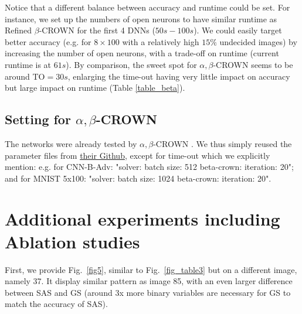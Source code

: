 Notice that a different balance between accuracy and runtime could be set. For instance, we set up the numbers of open neurons to have similar runtime as Refined $\beta$-CROWN for the first 4 DNNs ($50s-100s$). We could easily target better accuracy (e.g. for $8 \times 100$ with a relatively high $15\%$ undecided images) by increasing the number of open neurons, with a trade-off on runtime (current runtime is at $61s$).
By comparison, the sweet spot for $\alpha,\beta$-CROWN seems to be around TO$=30s$, enlarging the time-out having very little impact on accuracy but large impact on runtime
(Table \ref{table_beta}).






\subsection*{Setting for $\alpha,\beta$-CROWN}

The networks were already tested by $\alpha,\beta$-CROWN \cite{crown}. We thus simply reused the parameter files from \href{https://github.com/Verified-Intelligence/alpha-beta-CROWN/blob/main/complete_verifier/exp_configs/beta_crown/}{their Github}, 
except for time-out which we explicitly mention:
e.g. for CNN-B-Adv: "solver: batch size: 512 beta-crown: iteration: 20"; and
for MNIST 5x100: "solver: batch size: 1024 beta-crown: iteration: 20".






\section{Additional experiments including Ablation studies}	


First, we provide Fig.~\ref{fig5}, similar to 
Fig.~\ref{fig_table3} but on a different image, namely 37.
It display similar pattern as image 85, with an even larger difference between SAS and GS (around 3x more binary variables are necessary for GS to match the accuracy of SAS).


